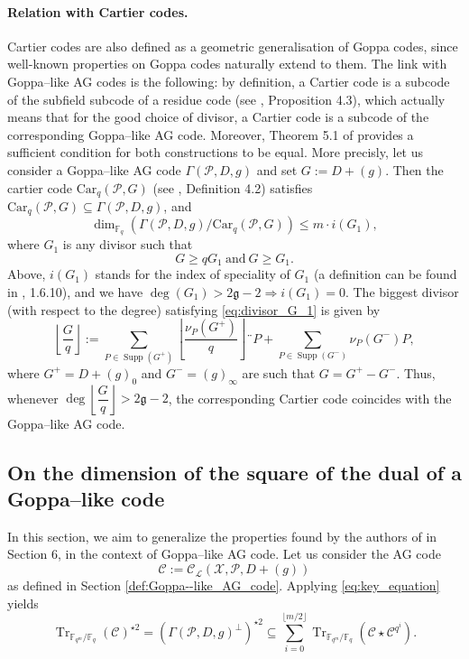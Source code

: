 \documentclass[a4paper]{article}
\theoremstyle{definition}
\theoremstyle{remark}
\newcommand{\calP}{\mathcal{P}}
\newcommand{\calL}{\mathcal{L}}
\newcommand{\calC}{\mathcal{C}}
\newcommand{\calX}{\mathcal{X}}
\newcommand{\fq}{\mathbb{F}_{q}}
\newcommand{\Tr}[1]{\operatorname{Tr}_{\mathbb{F}_{q^m}/\fq}\left(#1\right)}
\newcommand{\Supp}{\operatorname{Supp}}
\begin{document}
\paragraph{Relation with Cartier codes.} Cartier codes \cite{Cou14} are also defined as a geometric generalisation of Goppa codes, since well-known properties on Goppa codes naturally extend to them.
The link with Goppa--like AG codes is the following: by definition, a Cartier code is a subcode of the subfield subcode of a residue code (see \cite{Cou14}, Proposition 4.3), which actually means that for the good choice of divisor, a Cartier code is a subcode of the corresponding Goppa--like AG code. Moreover, Theorem 5.1 of \cite{Cou14} provides a sufficient condition for both constructions to be equal. More precisly, let us consider a Goppa--like AG code $\Gamma(\calP,D,g)$  and set $G := D+(g)$. Then the cartier code $\mathrm{Car}_q(\calP,G)$ (see \cite{Cou14}, Definition 4.2) satisfies $\mathrm{Car}_q(\calP,G) \subseteq \Gamma(\calP,D,g)$, and 
$$ \dim_{\fq} \left( \Gamma(\calP,D,g)/ \mathrm{Car}_q(\calP,G)\right) \leq m \cdot i(G_1),$$
where $G_1$ is any divisor such that 
\begin{equation} \label{eq:divisor_G_1}
G \geq qG_1 \ \mathrm{and} \ G \geq G_1.
\end{equation}
 Above, $i(G_1)$ stands for the index of speciality of $G_1$ (a definition can be found in \cite{Sti09}, 1.6.10), and we have $\deg(G_1) > 2\mathfrak{g}-2 \Rightarrow i(G_1) =0.$ The biggest divisor (with respect to the degree) satisfying \eqref{eq:divisor_G_1} is given by 
 $$\left\lfloor \frac{G}{q} \right\rfloor := \sum\limits_{P \in \Supp(G^+)} \left\lfloor\frac{\nu_P(G^+)}{q}\right\rfloor ¨P + \sum\limits_{P \in \Supp(G^-)}\nu_P(G^-)P,$$
 where $G^+ = D+(g)_0$ and $G^-=(g)_\infty$ are such that $G=G^+-G^-$.
Thus, whenever $\deg\left\lfloor \dfrac{G}{q} \right\rfloor > 2\mathfrak{g}-2$, the corresponding Cartier code coincides with the Goppa--like AG code. 


\subsection{On the dimension of the square of the dual of a Goppa--like code} \label{section:1st_improvement}

In this section, we aim to generalize the properties found by the authors of \cite{MT21} in Section 6, in the context of Goppa--like AG code. Let us consider the AG code 
$$\calC := \calC_{\calL}(\calX,\calP,D+(g))$$
as defined in Section \ref{def:Goppa--like_AG_code}. Applying \eqref{eq:key_equation} yields   
\begin{equation} \label{eq:key_equation_Goppa--like} 
\Tr{\calC}^{\star 2} = (\Gamma(\calP,D,g)^{\perp})^{\star2} \subseteq \sum\limits_{i=0}^{\lfloor{m/2} \rfloor} \Tr{\calC\star \calC^{q^i}}.
\end{equation}
\end{document}

